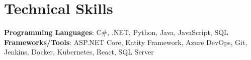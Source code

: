 \section{Technical Skills}
 \begin{itemize}[leftmargin=0.15in, label={}]
    \small{\item{
      \textbf{Programming Languages}{: C\#, .NET, Python, Java, JavaScript, SQL} \\
      \textbf{Frameworks/Tools}{: ASP.NET Core, Entity Framework, Azure DevOps, Git, Jenkins, Docker, Kubernetes, React, SQL Server} \\
    }}
 \end{itemize}